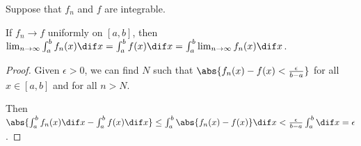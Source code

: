 \documentclass[11pt]{scrartcl}
\begin{document}
\begin{theorem}

Suppose that $f_n$ and $f$ are integrable.

If $f_n \to f$ uniformly on $[a, b]$, then $\lim_{n\to\infty}\int_a^bf_n(x) \dif x = \int_a^bf(x) \dif x = \int _a^b\lim_{n\to\infty}f_n(x) \dif x$. 
\end{theorem}

\begin{proof}
  \hfill

  Given $\epsilon > 0$, we can find $N$ such that $\abs{f_n(x) - f(x) < \frac{\epsilon}{b-a}}$ for all $x\in [a, b]$ and for all $n > N$.

  Then $\abs{\int_a^bf_n(x) \dif x - \int_a^bf(x)\dif x} \leq \int_a^b \abs{f_n(x) - f(x)} \dif x < \frac{\epsilon}{b-a}\int_a^b \dif x = \epsilon$.
\end{proof}
\end{document}
